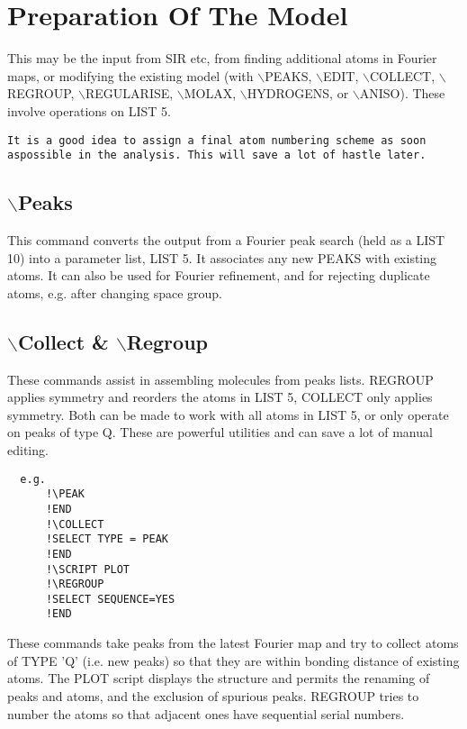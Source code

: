 \documentclass[10pt,a4paper]{report}
\begin{document}
\chapter{Preparation Of The Model}
 This may be the input from SIR etc, from finding additional atoms in Fourier maps, or modifying the existing model (with $\backslash$PEAKS, $\backslash$EDIT, $\backslash$COLLECT, $\backslash$REGROUP, $\backslash$REGULARISE, $\backslash$MOLAX, $\backslash$HYDROGENS, or $\backslash$ANISO). These involve operations on LIST 5.\small\begin{verbatim}It is a good idea to assign a final atom numbering scheme as soon aspossible in the analysis. This will save a lot of hastle later.\end{verbatim}\normalsize



\section{$\backslash$Peaks}


This command converts the output from a Fourier peak search (held as a
 LIST 10) into a parameter list, LIST 5. It associates any new PEAKS with
 existing atoms. It can also be used for Fourier refinement, and for
 rejecting duplicate atoms, e.g. after changing space group.



\section{$\backslash$Collect \& $\backslash$Regroup}


These commands assist in assembling molecules from peaks lists. REGROUP
 applies symmetry and
 reorders the atoms in LIST 5, COLLECT only applies symmetry. Both can be
 made to work with all atoms in LIST 5, or only operate on peaks of type
 Q. These are powerful utilities and can save a lot of manual editing.

\small\begin{verbatim}
  e.g.
      !\PEAK
      !END
      !\COLLECT
      !SELECT TYPE = PEAK
      !END
      !\SCRIPT PLOT
      !\REGROUP
      !SELECT SEQUENCE=YES
      !END
\end{verbatim}\normalsize


 These commands take peaks from the latest Fourier map and
 try to collect atoms of TYPE 'Q' (i.e. new peaks) so
 that they are within bonding distance of existing atoms. The PLOT
 script displays the structure and permits the renaming of peaks and
 atoms, and the exclusion of spurious peaks. REGROUP tries to number the
 atoms so that adjacent ones have sequential serial numbers.
\end{document}
